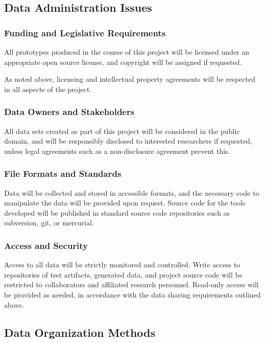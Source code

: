 \documentclass[letterpaper,twoside,11pt,headings=small]{scrartcl}
\begin{document}
\subsection{Data Administration Issues}
\label{sec:dmp:admin}

\subsubsection*{Funding and Legislative Requirements}

All prototypes produced in the course of this project will be licensed under
an appropriate open source license, and copyright will be assigned if requested.

As noted above, licensing and intellectual property agreements will be respected
in all aspects of the project.

\subsubsection*{Data Owners and Stakeholders}

All data sets created as part of this project will be considered in the public
domain, and will be responsibly disclosed to interested researchers if
requested, unless legal agreements such as a non-disclosure agreement prevent
this.

\subsubsection*{File Formats and Standards}

Data will be collected and stored in accessible formats, and the necessary
code to manipulate the data will be provided upon request.  Source code for
the tools developed will be published in standard source code repositories
such as subversion, git, or mercurial.

\subsubsection*{Access and Security}

Access to all data will be strictly monitored and controlled.  Write access to
repositories of test artifacts, generated data, and project source code will
be restricted to collaborators and affiliated research personnel.  Read-only
access will be provided as needed, in accordance with the data sharing
requirements outlined above.

\subsection{Data Organization Methods}
\end{document}
